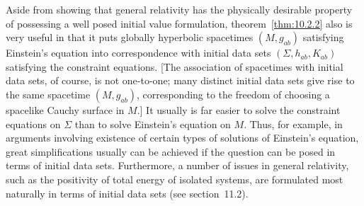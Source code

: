 Aside from showing that general relativity has the physically desirable property of
possessing a well posed initial value formulation, theorem~\ref{thm:10.2.2} also is
very useful in that it puts globally hyperbolic spacetimes \((M,g_{ab})\) satisfying
Einstein's equation into correspondence with initial data sets \((\Sigma,h_{ab},K_{ab})\)
satisfying the constraint equations. [The association of spacetimes with initial data
sets, of course, is not one-to-one; many distinct initial data sets give rise to the same
spacetime \((M,g_{ab})\), corresponding to the freedom of choosing a spacelike
Cauchy surface in \(M\).] It usually is far easier to solve the constraint equations on
\(\Sigma\) than to solve Einstein's equation on \(M\). Thus, for example, in arguments
involving existence of certain types of solutions of Einstein's equation, great
simplifications usually can be achieved if the question can be posed in terms of initial
data sets. Furthermore, a number of issues in general relativity, such as the positivity
of total energy of isolated systems, are formulated most naturally in terms of initial
data sets (see section~11.2).

